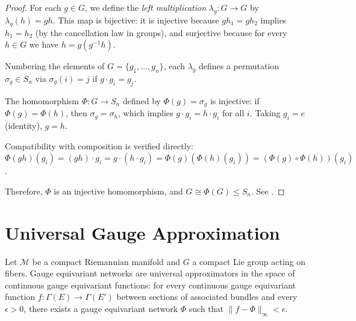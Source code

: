 \begin{proof}
For each $g \in G$, we define the \textit{left multiplication} $\lambda_g: G \to G$ by $\lambda_g(h) = gh$. This map is bijective: it is injective because $gh_1 = gh_2$ implies $h_1 = h_2$ (by the cancellation law in groups), and surjective because for every $h \in G$ we have $h = g(g^{-1}h)$.

Numbering the elements of $G = \{g_1, \ldots, g_n\}$, each $\lambda_g$ defines a permutation $\sigma_g \in S_n$ via $\sigma_g(i) = j$ if $g \cdot g_i = g_j$.

The homomorphism $\Phi: G \to S_n$ defined by $\Phi(g) = \sigma_g$ is injective: if $\Phi(g) = \Phi(h)$, then $\sigma_g = \sigma_h$, which implies $g \cdot g_i = h \cdot g_i$ for all $i$. Taking $g_i = e$ (identity), $g = h$.

Compatibility with composition is verified directly: $\Phi(gh)(g_i) = (gh) \cdot g_i = g \cdot (h \cdot g_i) = \Phi(g)(\Phi(h)(g_i)) = (\Phi(g) \circ \Phi(h))(g_i)$.

Therefore, $\Phi$ is an injective homomorphism, and $G \cong \Phi(G) \leq S_n$. See \citep[Section~4.2]{dummit2004abstract}.
\end{proof}

\section{Universal Gauge Approximation}\label{sec:aproximacion_universal_gauge}

\begin{theorem}\label{thm:aproximacion_universal_gauge_apendice}
Let $\mathcal{M}$ be a compact Riemannian manifold and $G$ a compact Lie group acting on fibers. Gauge equivariant networks are universal approximators in the space of continuous gauge equivariant functions: for every continuous gauge equivariant function $f: \Gamma(E) \to \Gamma(E')$ between sections of associated bundles and every $\epsilon > 0$, there exists a gauge equivariant network $\Phi$ such that $\|f - \Phi\|_\infty < \epsilon$.
\end{theorem}

